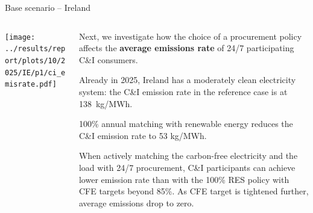 \begin{frame}{Base scenario -- Ireland}

{\footnotesize
\vspace{0.3cm}

\begin{columns}[T]
\begin{column}{9cm}
\centering

\texttt{[image: ../results/report/plots/10/2025/IE/p1/ci\_emisrate.pdf]}

\end{column}
\begin{column}{6cm}

\vspace{0.1cm}
Next, we investigate how the choice of a procurement policy affects the {\bf average emissions 
rate} of 24/7 participating C\&I consumers.

\vspace{0.3cm}
Already in 2025, Ireland has a moderately clean electricity system: 
the C\&I emission rate in the reference case is at 138~kg/MWh.

\vspace{0.3cm}
100\% annual matching with renewable energy reduces the 
C\&I emission rate to 53 kg/MWh.

\vspace{0.3cm}
When actively matching the carbon-free electricity and the load with 
24/7 procurement, C\&I participants can achieve \alert{lower emission 
rate than with the 100\% RES policy} with CFE targets beyond 85\%. 
As CFE target is tightened further, average emissions \alert{drop to zero}.

\end{column}
\end{columns}
}
\end{frame}



